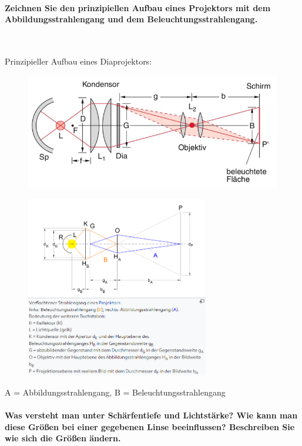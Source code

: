\documentclass[a4paper, 11pt, ngerman, parskip=half-]{scrartcl}
\begin{document}
\paragraph{Zeichnen Sie den prinzipiellen Aufbau eines Projektors mit dem Abbildungsstrahlengang
    und dem Beleuchtungsstrahlengang.} ~

Prinzipieller Aufbau eines Diaprojektors:
\begin{figure}[H]
    \centering
    \includegraphics[width=0.8\linewidth]{image/20/10.png}
\end{figure}

\begin{figure}[H]
    \centering
    \includegraphics[width=8cm]{image/20/9.png}
\end{figure}
A = Abbildungsstrahlengang, B = Beleuchtungsstrahlengang

\paragraph{Was versteht man unter Schärfentiefe und Lichtstärke? Wie kann man diese Größen bei
    einer gegebenen Linse beeinflussen? Beschreiben Sie wie sich die Größen ändern.} ~
\end{document}
